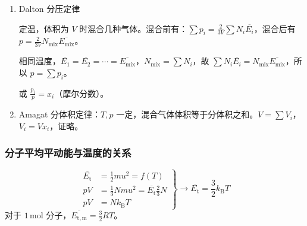 \begin{enumerate}
\begin{enumerate}
        \item 代入化简得 $\frac{\mathrm{d}V}{V} = -\frac{\mathrm{d}p}{p} + \frac{\mathrm{d}T}{T}$，积分得 $\ln V + \ln p = \ln T + \text{常数}$
        
        \item 取 $1\mathrm{\,mol}$ 气体，体积 $V_{\mathrm{m}}$，常数为 $\ln R$，得 $pV_{\mathrm{m}} = RT$。物质的量为 $n$，则有 $pV = nRT$。
        
        \item $n = \frac{N}{L}$，$N$为分子数，$L$为 Avogadro常数，令 $\frac{R}{L} = k_{\mathrm{B}}$（Boltzmann 常数），则 $pV = N k_{\mathrm{B}} T$。
    \end{enumerate}
    
    \item Dalton 分压定律
    
    定温，体积为 $V$ 时混合几种气体。混合前有：$\sum p_i = \frac{2}{3V} \sum N_i \overline{E_i}$，混合后有 $p = \frac{2}{3V} N_{\mathrm{mix}} \overline{E_{\mathrm{mix}}}$。
    
    相同温度，$\overline{E_1} = \overline{E_2} = \cdots = \overline{E_{\mathrm{mix}}}$，$N_{\mathrm{mix}} = \sum N_i$，故 $\sum N_i \overline{E_i} = N_{\mathrm{mix}} \overline{E_{\mathrm{mix}}}$，所以 $p = \sum p_i$。
    
    或 $\frac{p_i}{p} = x_i$（摩尔分数）。
    
    \item Amagat 分体积定律：$T, p$ 一定，混合气体体积等于分体积之和。$V = \sum V_i$，$V_i = V x_i$，证略。
\end{enumerate}

\subsubsection{分子平均平动能与温度的关系}

\begin{equation*}
    \left.
    \begin{aligned}
        \overline{E_{\mathrm{t}}} &= \frac12 m u^2 = f(T) \\
        pV &= \frac13 N m u^2 = \overline{E_{\mathrm{t}}} \frac23 N \\
        pV &= N k_{\mathrm{B}} T
    \end{aligned}
    \right\}
    \longrightarrow \overline{E_{\mathrm{t}}} = \frac32 k_{\mathrm{B}} T
\end{equation*}
对于 $1\mathrm{\,mol}$ 分子，$\overline{E_{\mathrm{t,m}}} = \frac32 RT$。

